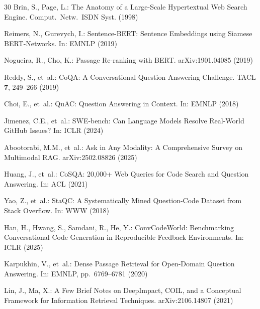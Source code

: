 \documentclass[runningheads]{llncs}
\begin{document}
\begin{thebibliography}{30}
Brin, S., Page, L.: The Anatomy of a Large-Scale Hypertextual
Web Search Engine. Comput.\ Netw.\ ISDN Syst. (1998)

Reimers, N., Gurevych, I.: Sentence-BERT: Sentence Embeddings
using Siamese BERT-Networks. In: EMNLP (2019)

Nogueira, R., Cho, K.: Passage Re-ranking with BERT.
arXiv:1901.04085 (2019)

Reddy, S., et~al.: CoQA: A Conversational Question Answering
Challenge. TACL \textbf{7}, 249--266 (2019)

Choi, E., et~al.: QuAC: Question Answering in Context.
In: EMNLP (2018)

Jimenez, C.E., et~al.: SWE-bench: Can Language Models Resolve
Real-World GitHub Issues? In: ICLR (2024)

Abootorabi, M.M., et~al.: Ask in Any Modality: A Comprehensive
Survey on Multimodal RAG. arXiv:2502.08826 (2025)

Huang, J., et~al.: CoSQA: 20,000+ Web Queries for Code Search
and Question Answering. In: ACL (2021)

Yao, Z., et~al.: StaQC: A Systematically Mined
Question-Code Dataset from Stack Overflow. In: WWW (2018)

Han, H., Hwang, S., Samdani, R., He, Y.: ConvCodeWorld:
Benchmarking Conversational Code Generation in Reproducible
Feedback Environments. In: ICLR (2025)

Karpukhin, V., et~al.: Dense Passage Retrieval for Open-Domain
Question Answering. In: EMNLP, pp.\ 6769--6781 (2020)

Lin, J., Ma, X.: A Few Brief Notes on DeepImpact, COIL, and a
Conceptual Framework for Information Retrieval Techniques.
arXiv:2106.14807 (2021)

\end{thebibliography}
\end{document}
